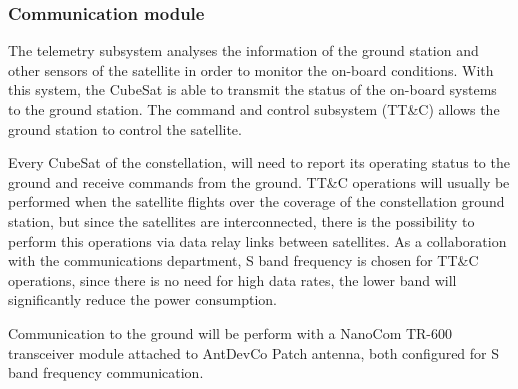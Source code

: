 \subsubsection{Communication module}

The telemetry subsystem analyses the information of the ground station and other sensors of the satellite in order to monitor the on-board conditions. With this system, the CubeSat is able to transmit the status of the on-board systems to the ground station. The command and control subsystem (TT\&C) allows the ground station to control the satellite.

Every CubeSat of the constellation, will need to report its operating status to the ground and receive commands from the ground. TT\&C operations will usually be performed when the satellite flights over the coverage of the constellation ground station, but since the satellites are interconnected, there is the possibility to perform this operations via data relay links between satellites. As a collaboration with the communications department, S band frequency is chosen for TT\&C operations, since there is no need for high data rates, the lower band will significantly reduce the power consumption.

Communication to the ground will be perform with a NanoCom TR-600 transceiver module attached to AntDevCo Patch antenna, both configured for S band frequency communication.